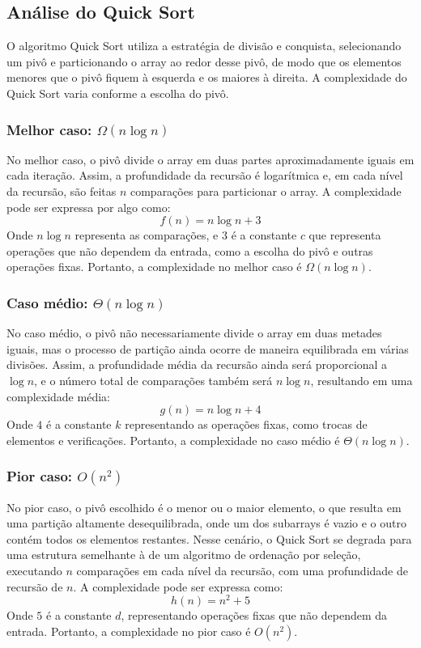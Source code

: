 \subsection{Análise do Quick Sort}

O algoritmo Quick Sort utiliza a estratégia de divisão e conquista, selecionando um pivô e particionando o array ao redor desse pivô, de modo que os elementos menores que o pivô fiquem à esquerda e os maiores à direita. A complexidade do Quick Sort varia conforme a escolha do pivô.

\subsubsection{Melhor caso: \(\Omega(n \log n)\)}
No melhor caso, o pivô divide o array em duas partes aproximadamente iguais em cada iteração. Assim, a profundidade da recursão é logarítmica e, em cada nível da recursão, são feitas \(n\) comparações para particionar o array. A complexidade pode ser expressa por algo como:
\[
f(n) = n \log n + 3
\]
Onde \(n \log n\) representa as comparações, e \(3\) é a constante \(c\) que representa operações que não dependem da entrada, como a escolha do pivô e outras operações fixas. Portanto, a complexidade no melhor caso é \(\Omega(n \log n)\).

\subsubsection{Caso médio: \(\Theta(n \log n)\)}
No caso médio, o pivô não necessariamente divide o array em duas metades iguais, mas o processo de partição ainda ocorre de maneira equilibrada em várias divisões. Assim, a profundidade média da recursão ainda será proporcional a \( \log n \), e o número total de comparações também será \(n \log n\), resultando em uma complexidade média:
\[
g(n) = n \log n + 4
\]
Onde \(4\) é a constante \(k\) representando as operações fixas, como trocas de elementos e verificações. Portanto, a complexidade no caso médio é \(\Theta(n \log n)\).

\subsubsection{Pior caso: \(O(n^2)\)}
No pior caso, o pivô escolhido é o menor ou o maior elemento, o que resulta em uma partição altamente desequilibrada, onde um dos subarrays é vazio e o outro contém todos os elementos restantes. Nesse cenário, o Quick Sort se degrada para uma estrutura semelhante à de um algoritmo de ordenação por seleção, executando \(n\) comparações em cada nível da recursão, com uma profundidade de recursão de \(n\). A complexidade pode ser expressa como:
\[
h(n) = n^2 + 5
\]
Onde \(5\) é a constante \(d\), representando operações fixas que não dependem da entrada. Portanto, a complexidade no pior caso é \(O(n^2)\).

